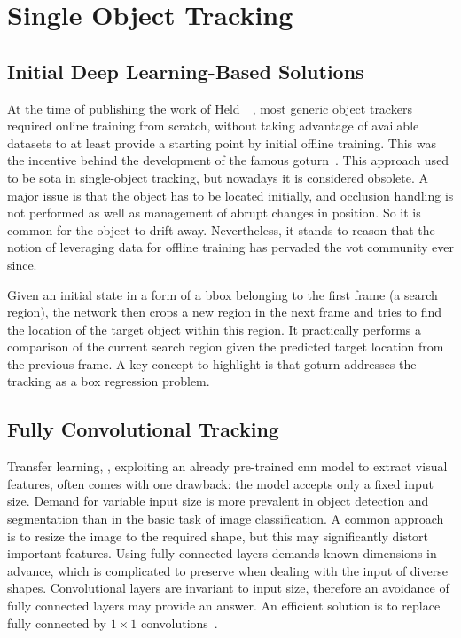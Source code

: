 \section{Single Object Tracking}
\label{sec:SingleObjectTracking}

\subsection{Initial Deep Learning-Based Solutions}
\label{ssec:InitialDeepLearningBasedSolutions}

At the time of publishing the work of Held~\etal{}~\cite{held2016goturn}, most generic object trackers required online training from scratch, without taking advantage of available datasets to at least provide a starting point by initial offline training. This was the incentive behind the development of the famous \gls{goturn}~\cite{held2016goturn}. This approach used to be \gls{sota} in single-object tracking, but nowadays it is considered obsolete. A major issue is that the object has to be located initially, and occlusion handling is not performed as well as management of abrupt changes in position. So it is common for the object to drift away. Nevertheless, it stands to reason that the notion of leveraging data for offline training has pervaded the \gls{vot} community ever since.

Given an initial state in a form of a \gls{bbox} belonging to the first frame (a search region), the network then crops a new region in the next frame and tries to find the location of the target object within this region. It practically performs a comparison of the current search region given the predicted target location from the previous frame. A key concept to highlight is that \gls{goturn} addresses the tracking as a box regression problem.

\subsection{Fully Convolutional Tracking}
\label{ssec:FullyConvolutionalTracking}

Transfer learning, \egtext{}, exploiting an already pre-trained \gls{cnn} model to extract visual features, often comes with one drawback: the model accepts only a fixed input size. Demand for variable input size is more prevalent in object detection and segmentation than in the basic task of image classification. A common approach is to resize the image to the required shape, but this may significantly distort important features. Using fully connected layers demands known dimensions in advance, which is complicated to preserve when dealing with the input of diverse shapes. Convolutional layers are invariant to input size, therefore an avoidance of fully connected layers may provide an answer. An efficient solution is to replace fully connected by $1 \times 1$ convolutions~\cite{lin2014netinnet}.

